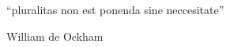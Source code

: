 \chapter*{}
\thispagestyle{empty}
\epigraph{``pluralitas non est ponenda sine neccesitate''}{William de Ockham}

